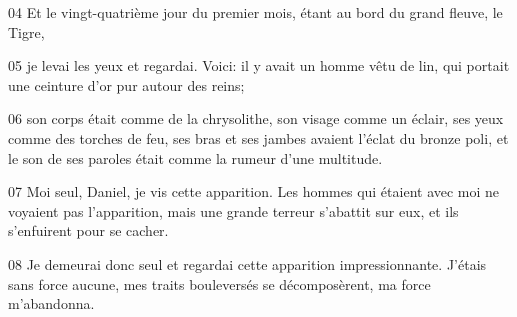 04 Et le vingt-quatrième jour du premier mois, étant au bord du grand fleuve, le Tigre,

05 je levai les yeux et regardai. Voici: il y avait un homme vêtu de lin, qui portait une ceinture d’or pur autour des reins;

06 son corps était comme de la chrysolithe, son visage comme un éclair, ses yeux comme des torches de feu, ses bras et ses jambes avaient l’éclat du bronze poli, et le son de ses paroles était comme la rumeur d’une multitude.

07 Moi seul, Daniel, je vis cette apparition. Les hommes qui étaient avec moi ne voyaient pas l’apparition, mais une grande terreur s’abattit sur eux, et ils s’enfuirent pour se cacher.

08 Je demeurai donc seul et regardai cette apparition impressionnante. J’étais sans force aucune, mes traits bouleversés se décomposèrent, ma force m’abandonna.
